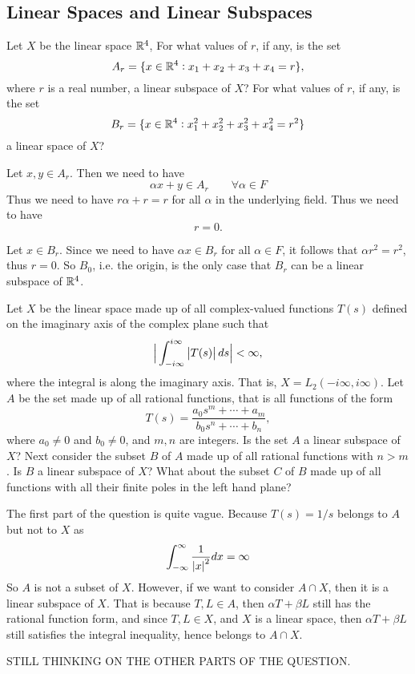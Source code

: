 \subsection{Linear Spaces and Linear Subspaces}
\begin{problem}
	Let $ X $ be the linear space $ \mathbb{R}^4 $, For what values of $ r $, if any, is the set
	\[ A_r = \{x\in\mathbb{R}^4: x_1+x_2+x_3+x_4 = r\}, \]
	where $ r $ is a real number, a linear subspace of $ X $? For what values of $ r $, if any,
	is the set
	\[ B_r = \{x\in \mathbb{R}^4: x_1^2 + x_2^2 + x_3^2+x_4^2 = r^2\} \]
	a linear space of $ X $?
\end{problem}

\begin{solution}
	Let $ x,y \in A_r $. Then we need to have
	\[ \alpha x + y \in A_r \qquad \forall\alpha\in F \]
	Thus we need to have $ r\alpha + r = r $ for all $ \alpha $ in the underlying field. Thus we need to have
	\[ r = 0. \]
	
	Let $ x \in B_r $. Since we need to have $ \alpha x \in B_r $ for all $ \alpha\in F $, it follows that $ \alpha r^2 = r^2 $, thus $ r=0 $. So $ B_0 $, i.e. the origin, is the only case that $ B_r $ can be a linear subspace of $ \mathbb{R}^4 $.
\end{solution}


\begin{problem}
	Let $ X $ be the linear space made up of all complex-valued functions $ T(s) $ defined on the imaginary axis of the complex plane such that
	\[ \big|\int_{-i\infty}^{i\infty} \left|T(s)\right| ds\big|<\infty, \] 
	where the integral is along the imaginary axis. That is, $ X = L_2(-i\infty,i\infty) $. Let $ A $ be the set made up of all rational functions, that is all functions of the form
	\[ T(s) = \frac{a_0s^m + \cdots + a_m}{b_0s^n + \cdots + b_n}, \]
	where $ a_0 \neq0 $ and $ b_0 \neq 0 $, and $ m,n $ are integers. Is the set $ A $ a linear subspace of $ X $? Next consider the subset $ B $ of $ A $ made up of all rational functions with $ n>m$. Is $ B $ a linear subspace of $ X $? What about the subset $ C $ of $ B $ made up of all functions with all their finite poles in the left hand plane?
\end{problem}

\begin{solution}
	The first part of the question is quite vague. Because $ T(s) = 1/s $ belongs to $ A $ but not to $ X $ as
	\[ \int_{-\infty}^{\infty} \frac{1}{\left|x\right|^2} dx = \infty \]
	So $ A $ is not a subset of $ X $. However, if we want to consider $ A\cap X $, then it is a linear subspace of $ X $. That is because $ T, L \in A $, then $ \alpha T + \beta L $ still has the rational function form, and since $ T,L \in X $, and $ X $ is a linear space, then $ \alpha T + \beta L $ still satisfies the integral inequality, hence belongs to $ A\cap X $.
	
	STILL THINKING ON THE OTHER PARTS OF THE QUESTION.
\end{solution}


